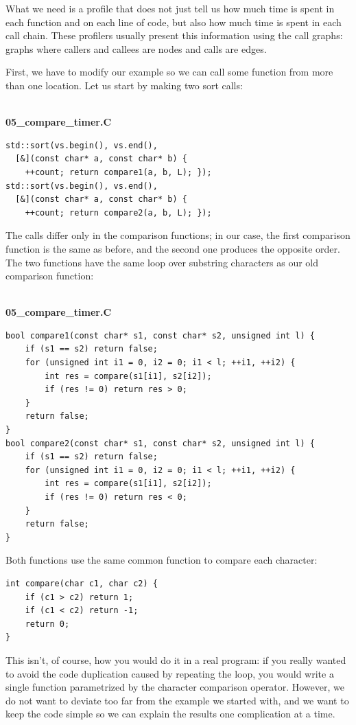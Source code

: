 What we need is a profile that does not just tell us how much time is spent in each function and on each line of code, but also how much time is spent in each call chain. These profilers usually present this information using the call graphs: graphs where callers and callees are nodes and calls are edges.

First, we have to modify our example so we can call some function from more than one location. Let us start by making two sort calls:

\hspace*{\fill} \\ %
\noindent
\textbf{05\_compare\_timer.C}
\begin{lstlisting}[style=styleCXX]
std::sort(vs.begin(), vs.end(),
  [&](const char* a, const char* b) {
	++count; return compare1(a, b, L); });
std::sort(vs.begin(), vs.end(),
  [&](const char* a, const char* b) {
	++count; return compare2(a, b, L); });
\end{lstlisting}

The calls differ only in the comparison functions; in our case, the first comparison function is the same as before, and the second one produces the opposite order. The two functions have the same loop over substring characters as our old comparison function:

\hspace*{\fill} \\ %
\noindent
\textbf{05\_compare\_timer.C}
\begin{lstlisting}[style=styleCXX]
bool compare1(const char* s1, const char* s2, unsigned int l) {
	if (s1 == s2) return false;
	for (unsigned int i1 = 0, i2 = 0; i1 < l; ++i1, ++i2) {
		int res = compare(s1[i1], s2[i2]);
		if (res != 0) return res > 0;
	}
	return false;
}
bool compare2(const char* s1, const char* s2, unsigned int l) {
	if (s1 == s2) return false;
	for (unsigned int i1 = 0, i2 = 0; i1 < l; ++i1, ++i2) {
		int res = compare(s1[i1], s2[i2]);
		if (res != 0) return res < 0;
	}
	return false;
}
\end{lstlisting}

Both functions use the same common function to compare each character:

\begin{lstlisting}[style=styleCXX]
int compare(char c1, char c2) {
	if (c1 > c2) return 1;
	if (c1 < c2) return -1;
	return 0;
}
\end{lstlisting}

This isn't, of course, how you would do it in a real program: if you really wanted to avoid the code duplication caused by repeating the loop, you would write a single function parametrized by the character comparison operator. However, we do not want to deviate too far from the example we started with, and we want to keep the code simple so we can explain the results one complication at a time.

